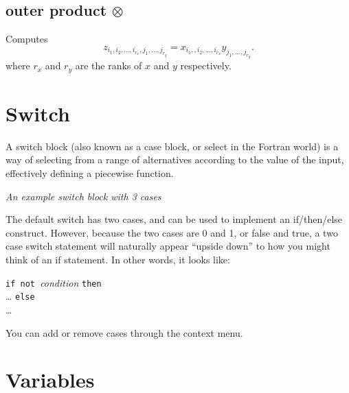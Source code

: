 \subsection{outer product $\otimes$}\label{Operation:outerProduct}
Computes 
\begin{displaymath}
z_{i_1,i_2,\ldots,i_{r_x},j_1,\ldots,j_{r_y}} =
x_{i_1,,i_2,\ldots,i_{r_x}}y_{j_1,\ldots,j_{r_y}}.
\end{displaymath}
where $r_x$ and $r_y$ are the ranks of $x$ and $y$ respectively.


\section{Switch}\label{SwitchIcon}

A switch block (also known as a case block, or select in the Fortran
world) is a way of selecting from a range of alternatives according
to the value of the input, effectively defining a piecewise function.

\begin{center}
{\em An example switch block with 3 cases}
\end{center}

The default switch has two cases, and can be used to implement an
if/then/else construct. However, because the two cases are 0 and 1,
or false and true, a two case switch statement will naturally appear
``upside down'' to how you might think of an if statement. In other
words, it looks like:

\parbox{\textwidth}{
{\tt if not }{\em condition} {\tt then}\\
 \ldots
{\tt else}\\
\ldots
}

You can add or remove cases through the context menu. 

\section{Variables}\label{Variable:constant}\label{Variable:parameter}
\label{Variable:flow}\label{Variable:integral}\label{Variable:stock}

